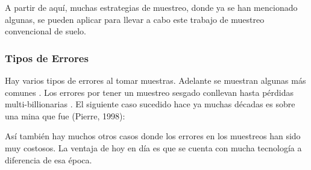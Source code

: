 \documentclass[conference]{IEEEtran}
\begin{document}
A partir de aquí, muchas estrategias de muestreo, donde ya se han mencionado algunas, se pueden aplicar para llevar a cabo este trabajo de muestreo convencional de suelo.

\subsubsection{Tipos de Errores}

Hay varios tipos de errores al tomar muestras. Adelante se muestran algunas más comunes \cite{innec-2007}. Los errores por tener un muestreo sesgado conllevan hasta pérdidas multi-billionarias \cite{gy-1998}. El siguiente caso sucedido hace ya muchas décadas es sobre una mina que fue (Pierre, 1998):

\bigbreak


\bigbreak

Así también hay muchos otros casos donde los errores en los muestreos han sido muy costosos. La ventaja de hoy en día es que se cuenta con mucha tecnología a diferencia de esa época.

\bigbreak
\end{document}
